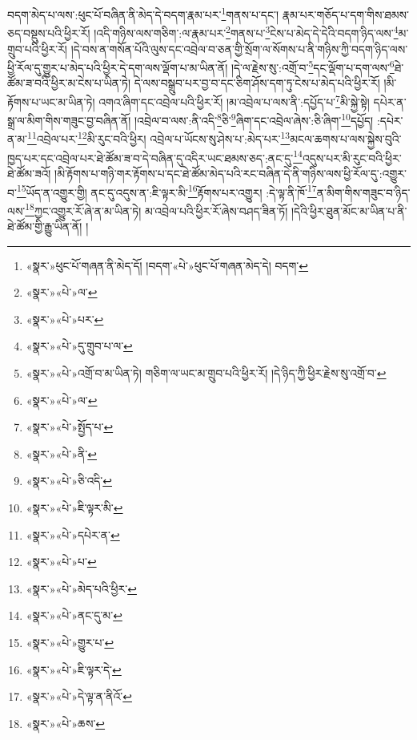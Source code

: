 བདག་མེད་པ་ལས་:ཕུང་པོ་བཞིན་ནི་མེད་དེ་བདག་རྣམ་པར་\footnote{«སྣར་»ཕུང་པོ་གཞན་ནི་མེད་དོ། །བདག་«པེ་»ཕུང་པོ་གཞན་མེད་དེ། བདག་}གནས་པ་དང་། རྣམ་པར་གཅོད་པ་དག་གིས་ཐམས་ཅད་བསྡུས་པའི་ཕྱིར་རོ། །འདི་གཉིས་ལས་གཅིག་:ལ་རྣམ་པར་\footnote{«སྣར་»«པེ་»ལ་}གནས་པ་\footnote{«སྣར་»«པེ་»པར་}ངེས་པ་མེད་དེ་དེའི་བདག་ཉིད་ལས་\footnote{«སྣར་»«པེ་»དུ་གྲུབ་པ་ལ་}མ་གྲུབ་པའི་ཕྱིར་རོ། །དེ་བས་ན་གསོན་པོའི་ལུས་དང་འབྲེལ་བ་ཅན་གྱི་སྲོག་ལ་སོགས་པ་ནི་གཉིས་ཀྱི་བདག་ཉིད་ལས་ཕྱི་རོལ་དུ་གྱུར་པ་མེད་པའི་ཕྱིར་དེ་དག་ལས་ལྡོག་པ་མ་ཡིན་ནོ། །དེ་ལ་རྗེས་སུ་:འགྲོ་བ་\footnote{«སྣར་»«པེ་»འགྲོ་བ་མ་ཡིན་ཏེ། གཅིག་ལ་ཡང་མ་གྲུབ་པའི་ཕྱིར་རོ། །དེ་ཉིད་ཀྱི་ཕྱིར་རྗེས་སུ་འགྲོ་བ་}དང་ལྡོག་པ་དག་ལས་\footnote{«སྣར་»«པེ་»ལ་}ཐེ་ཚོམ་ཟ་བའི་ཕྱིར་མ་ངེས་པ་ཡིན་ཏེ། དེ་ལས་བསྒྲུབ་པར་བྱ་བ་དང་ཅིག་ཤོས་དག་ཏུ་ངེས་པ་མེད་པའི་ཕྱིར་རོ། །མི་རྟོགས་པ་ཡང་མ་ཡིན་ཏེ། འགའ་ཞིག་དང་འབྲེལ་པའི་ཕྱིར་རོ། །མ་འབྲེལ་པ་ལས་ནི་:དཔྱོད་པ་\footnote{«སྣར་»«པེ་»སྤྱོད་པ་}མི་སྐྱེ་སྟེ། དཔེར་ན་སྒྲ་ལ་མིག་གིས་གཟུང་བྱ་བཞིན་ནོ། །འབྲེལ་བ་ལས་:ནི་འདི་\footnote{«སྣར་»«པེ་»ནི་}ཅི་\footnote{«སྣར་»«པེ་»ཅི་འདི་}ཞིག་དང་འབྲེལ་ཞེས་:ཅི་ཞིག་\footnote{«སྣར་»«པེ་»ཇི་ལྟར་མི་}དཔྱོད། :དཔེར་ན་མ་\footnote{«སྣར་»«པེ་»དཔེར་ན་}འབྲེལ་པར་\footnote{«སྣར་»«པེ་»པ་}མི་རུང་བའི་ཕྱིར། འབྲེལ་པ་ཡོངས་སུ་ཤེས་པ་:མེད་པར་\footnote{«སྣར་»«པེ་»མེད་པའི་ཕྱིར་}མངལ་ཆགས་པ་ལས་སྐྱེས་བུའི་ཁྱད་པར་དང་འབྲེལ་པར་ཐེ་ཚོམ་ཟ་བ་དེ་བཞིན་དུ་འདིར་ཡང་ཐམས་ཅད་:ནང་དུ་\footnote{«སྣར་»«པེ་»ནང་དུ་མ་}འདུས་པར་མི་རུང་བའི་ཕྱིར་ཐེ་ཚོམ་ཟའོ། །མི་རྟོགས་པ་གཉི་གར་རྟོགས་པ་དང་ཐེ་ཚོམ་མེད་པའི་རང་བཞིན་དེ་ནི་གཉིས་ལས་ཕྱི་རོལ་དུ་:འགྱུར་བ་\footnote{«སྣར་»«པེ་»གྱུར་པ་}ཡོད་ན་འགྱུར་གྱི། ནང་དུ་འདུས་ན་:ཇི་ལྟར་མི་\footnote{«སྣར་»«པེ་»ཇི་ལྟར་དེ་}རྟོགས་པར་འགྱུར། :དེ་ལྟ་ནི་ཁོ་\footnote{«སྣར་»«པེ་»དེ་ལྟ་ན་ནིའོ་}ན་མིག་གིས་གཟུང་བ་ཉིད་ལས་\footnote{«སྣར་»«པེ་»ཆས་}ཀྱང་འགྱུར་རོ་ཞེ་ན་མ་ཡིན་ཏེ། མ་འབྲེལ་པའི་ཕྱིར་རོ་ཞེས་བཤད་ཟིན་ཏོ། །དེའི་ཕྱིར་ཐུན་མོང་མ་ཡིན་པ་ནི་ཐེ་ཚོམ་གྱི་རྒྱུ་ཡིན་ནོ། །
